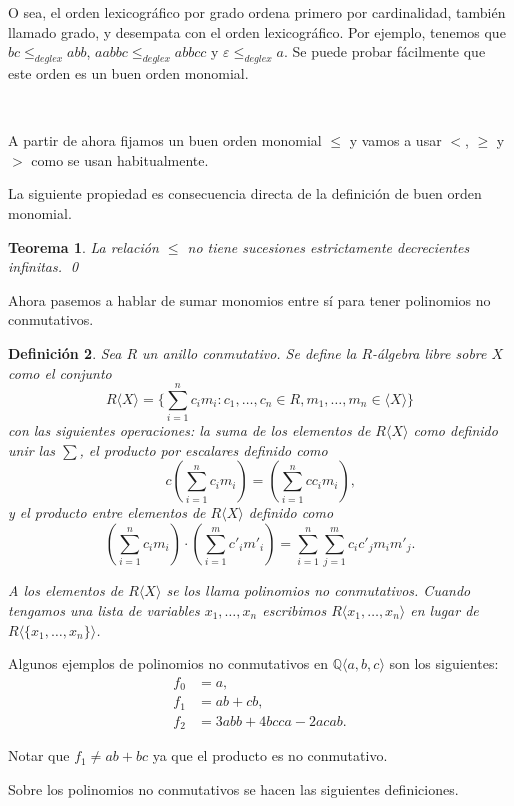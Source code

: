 \documentclass[12pt]{report}
\theoremstyle{customstyle}
\newtheorem{theorem}{Teorema}[chapter]
\newtheorem{definition}[theorem]{Definición}
\theoremstyle{factstyle}
\begin{document}
O sea, el orden lexicográfico por grado ordena primero por cardinalidad, también llamado grado, y desempata con el orden lexicográfico. Por ejemplo, tenemos que $bc ≤_{deglex} abb$, $aabbc ≤_{deglex} abbcc$ y $ε ≤_{deglex} a$. Se puede probar fácilmente que este orden es un buen orden monomial.

\

A partir de ahora fijamos un buen orden monomial $≤$ y vamos a usar $<$, $≥$ y $>$ como se usan habitualmente.

La siguiente propiedad es consecuencia directa de la definición de buen orden monomial.

\begin{theorem}\label{thm:≤ no sucesiones dec inf}
  La relación $≤$ no tiene sucesiones estrictamente decrecientes infinitas.
  \qed
\end{theorem}

Ahora pasemos a hablar de sumar monomios entre sí para tener polinomios no conmutativos.

\begin{definition}
  Sea $R$ un anillo conmutativo. Se define la $R$-álgebra libre sobre $X$ como el conjunto
  \[ R⟨X⟩ = \{∑_{i = 1}^n c_i m_i : c_1, …, c_n ∈ R, m_1, …, m_n ∈ ⟨X⟩\}\]
  con las siguientes operaciones: la suma de los elementos de $R⟨X⟩$ como definido unir las $∑$, el producto por escalares definido como
  \[ c (∑_{i = 1}^n c_i m_i) = (∑_{i = 1}^n c c_i m_i) \text{,}\]
  y el producto entre elementos de $R⟨X⟩$ definido como
  \[ (∑_{i = 1}^n c_i m_i) · (∑_{i = 1}^m c'_i m'_i) = ∑_{i = 1}^n ∑_{j = 1}^m c_i c'_j m_i m'_j \text{.}\]

  A los elementos de $R⟨X⟩$ se los llama polinomios no conmutativos. Cuando tengamos una lista de variables $x_1, …, x_n$ escribimos $R⟨x_1, …, x_n⟩$ en lugar de $R⟨\{x_1, …, x_n\}⟩$.
\end{definition}

Algunos ejemplos de polinomios no conmutativos en $ℚ⟨a, b, c⟩$ son los siguientes:
\begin{align*}
  f_0 &= a \text{,} \\
  f_1 &= ab + cb \text{,} \\
  f_2 &= 3 abb + 4 bcca - 2 acab \text{.}
\end{align*}

\noindent Notar que $f_1 ≠ ab + bc$ ya que el producto es no conmutativo.

Sobre los polinomios no conmutativos se hacen las siguientes definiciones.
\end{document}
